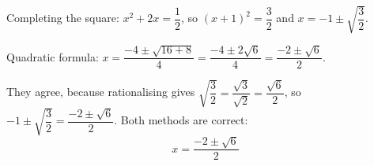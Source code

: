 Completing the square: \(x^2+2x=\dfrac{1}{2}\), so \((x+1)^2=\dfrac{3}{2}\) and \(x=-1\pm\sqrt{\dfrac{3}{2}}\).

Quadratic formula: \(x=\dfrac{-4\pm\sqrt{16+8}}{4}=\dfrac{-4\pm 2\sqrt6}{4}=\dfrac{-2\pm\sqrt6}{2}\).

They agree, because rationalising gives \(\sqrt{\dfrac{3}{2}}=\dfrac{\sqrt3}{\sqrt2}=\dfrac{\sqrt6}{2}\), so \(-1\pm\sqrt{\dfrac{3}{2}}=\dfrac{-2\pm\sqrt6}{2}\). Both methods are correct:
\[
\boxed{x=\dfrac{-2\pm\sqrt6}{2}}
\]
